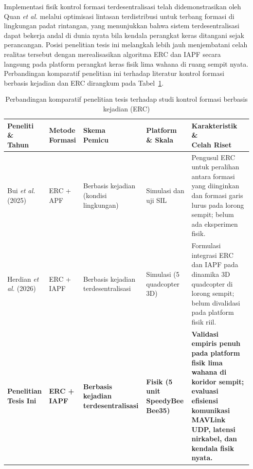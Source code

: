 \documentclass[12pt,a4paper]{report}
\begin{document}
Implementasi fisik kontrol formasi terdesentralisasi telah didemonstrasikan oleh Quan \textit{et al.} \cite{quanDistributedSwarmTrajectory2022b, quanRobustEfficientTrajectory2023} melalui optimisasi lintasan terdistribusi untuk terbang formasi di lingkungan padat rintangan, yang menunjukkan bahwa sistem terdesentralisasi dapat bekerja andal di dunia nyata bila kendala perangkat keras ditangani sejak perancangan. Posisi penelitian tesis ini melangkah lebih jauh menjembatani celah realitas tersebut dengan merealisasikan algoritma ERC dan IAPF secara langsung pada platform perangkat keras fisik lima wahana di ruang sempit nyata. Perbandingan komparatif penelitian ini terhadap literatur kontrol formasi berbasis kejadian dan ERC dirangkum pada Tabel~\ref{tab:studi-terkait-rujukan}.

\begin{table}[htbp]
    \centering
    \caption{Perbandingan komparatif penelitian tesis terhadap studi kontrol formasi berbasis kejadian (ERC)}
    \label{tab:studi-terkait-rujukan}
    \begingroup
    \footnotesize
    \setlength{\tabcolsep}{3.5pt}
    \renewcommand{\arraystretch}{1.25}
    \begin{tabularx}{\textwidth}{|>{\raggedright\arraybackslash}p{2.3cm}|>{\raggedright\arraybackslash}p{2.3cm}|>{\raggedright\arraybackslash}p{2.0cm}|>{\centering\arraybackslash}p{1.8cm}|>{\raggedright\arraybackslash}X|}
        \hline
        \rowcolor{gray!20}
        \thead{Peneliti \&\\Tahun} & \thead{Metode\\Formasi} & \thead{Skema\\Pemicu} & \thead{Platform\\\& Skala} & \thead{Karakteristik \&\\Celah Riset} \\ \hline
        Bui \textit{et al.} (2025) \cite{buiEventbasedReconfigurationControl2025} & ERC + APF & Berbasis kejadian (kondisi lingkungan) & Simulasi dan uji SIL & Pengusul ERC untuk peralihan antara formasi yang diinginkan dan formasi garis lurus pada lorong sempit; belum ada eksperimen fisik. \\ \hline
        Herdian \textit{et al.} (2026) \cite{herdianDecentralizedFormationControl2026} & ERC + IAPF & Berbasis kejadian terdesentralisasi & Simulasi (5 quadcopter 3D) & Formulasi integrasi ERC dan IAPF pada dinamika 3D quadcopter di lorong sempit; belum divalidasi pada platform fisik riil. \\ \hline
        \textbf{Penelitian Tesis Ini} & \textbf{ERC + IAPF} & \textbf{Berbasis kejadian terdesentralisasi} & \textbf{Fisik (5 unit SpeedyBee Bee35)} & \textbf{Validasi empiris penuh pada platform fisik lima wahana di koridor sempit; evaluasi efisiensi komunikasi MAVLink UDP, latensi nirkabel, dan kendala fisik nyata.} \\ \hline
    \end{tabularx}
    \endgroup
\end{table}
\end{document}
